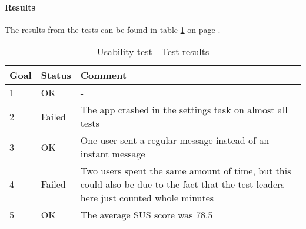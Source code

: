 		\paragraph{Results}
			The results from the tests can be found in table \ref{tab:usabilitytestresults} on page \pageref{tab:usabilitytestresults}.
			\begin{table}
			\begin{tabular}{l|l|p{8cm}}	\hline
				\textbf{Goal}&\textbf{Status}&\textbf{Comment}\\ \hline \hline
				1&OK&-\\ \hline
				2&Failed&The app crashed in the settings task on almost all tests\\ \hline
				3&OK&One user sent a regular message instead of an instant message\\ \hline
				4&Failed&Two users spent the same amount of time, but this could also be due to the fact that the test leaders here just counted whole minutes\\ \hline
				5&OK&The average SUS score was 78.5\\ \hline 

			\end{tabular}
			\caption{Usability test - Test results} \label{tab:usabilitytestresults}
		\end{table}

